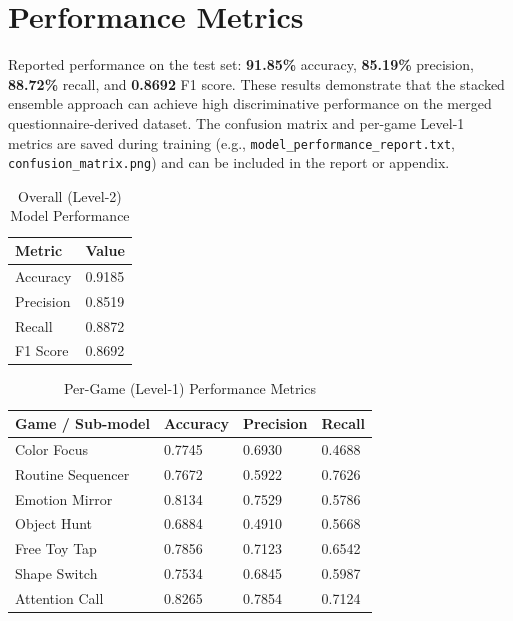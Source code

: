 \documentclass[12pt,a4paper]{report}
\begin{document}
\section{Performance Metrics}
Reported performance on the test set: \textbf{91.85\%} accuracy, \textbf{85.19\%} precision, \textbf{88.72\%} recall, and \textbf{0.8692} F1 score. These results demonstrate that the stacked ensemble approach can achieve high discriminative performance on the merged questionnaire-derived dataset. The confusion matrix and per-game Level-1 metrics are saved during training (e.g., \texttt{model\_performance\_report.txt}, \texttt{confusion\_matrix.png}) and can be included in the report or appendix.
\begin{table}[!htbp]
    \centering
    \caption{Overall (Level-2) Model Performance}
    \renewcommand{\arraystretch}{1.35}
    \begin{tabular}{|p{6cm}|p{3cm}|}
        \hline
        \textbf{Metric} & \textbf{Value} \\
        \hline
        Accuracy & 0.9185 \\
        \hline
        Precision & 0.8519 \\
        \hline
        Recall & 0.8872 \\
        \hline
        F1 Score & 0.8692 \\
        \hline
    \end{tabular}
\end{table}
\begin{table}[!htbp]
    \centering
    \caption{Per-Game (Level-1) Performance Metrics}
    \renewcommand{\arraystretch}{1.35}
    \small
    \begin{tabular}{|p{4.2cm}|p{2.2cm}|p{2.2cm}|p{2.2cm}|}
        \hline
        \textbf{Game / Sub-model} & \textbf{Accuracy} & \textbf{Precision} & \textbf{Recall} \\
        \hline
        Color Focus & 0.7745 & 0.6930 & 0.4688 \\
        \hline
        Routine Sequencer & 0.7672 & 0.5922 & 0.7626 \\
        \hline
        Emotion Mirror & 0.8134 & 0.7529 & 0.5786 \\
        \hline
        Object Hunt & 0.6884 & 0.4910 & 0.5668 \\
        \hline
        Free Toy Tap & 0.7856 & 0.7123 & 0.6542 \\
        \hline
        Shape Switch & 0.7534 & 0.6845 & 0.5987 \\
        \hline
        Attention Call & 0.8265 & 0.7854 & 0.7124 \\
        \hline
    \end{tabular}
\end{table}
\end{document}
